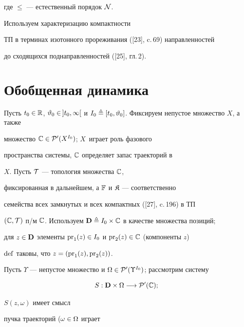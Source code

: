 где $\le$ --- естественный порядок ${\cal N}$.


Используем характеризацию компактности


ТП в терминах изотонного прореживания ([23], c.\,69) направленностей


до сходящихся поднаправленностей ([25], гл.\,2).





\section{Обобщенная динамика}





Пусть ${t_0} \in {\Bbb R}$, ${{\vt}_0} \in\, ]{t_0},\infty[$ и ${I_0}


\stac [{t_0},{{\vt}_0}]$. Фиксируем непустое множество $X$, а также


множество ${\Bbb C} \in {{\cal P}'}(X^{I_0})$; $X$~играет роль фазового


пространства системы, ${\Bbb C}$ определяет запас траекторий в


$X$. Пусть ${\cal T}$ --- топология множества ${\Bbb C}$,


фиксированная в дальнейшем, а ${\Bbb F}$ и ${\frak K}$ --- соответственно


семейства всех замкнутых и всех компактных ([27], c.\,196) в ТП


$({\Bbb C},{\cal T})$ п/м ${\Bbb C}$. Используем ${\bold D} \stac


{I_0} \times {\Bbb C}$ в качестве множества позиций;


для $z \in {\bold D}$ элементы ${{\pr_1}(z)} \in {I_0}$ и ${{\pr_2}(z)} \in


{\Bbb C}$ (компоненты $z$)


$\operatorname{def}$ таковы, что $z = ({{\operatorname{pr}}_1}(z),{{\operatorname{pr}_2}(z)})$.


Пусть $\Upsilon$ --- непустое множество и $\Om \in


{{\cal P}'}({\Upsilon}^{I_0})$; рассмотрим систему


\begin{equation}


S:{\bold D} \times \Om \lo {{\cal P}'}({\Bbb C});


\end{equation}


$S(z,\omega)$ имеет смысл


пучка траекторий ($\omega \in \Omega$ играет


